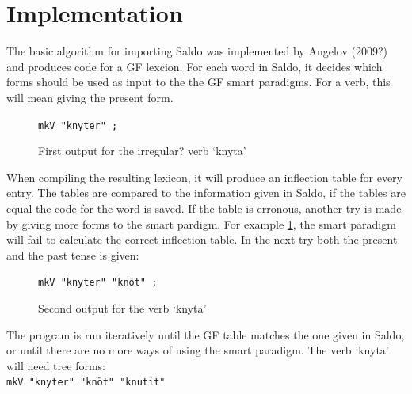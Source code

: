 \documentclass{report}
\begin{document}
\section{Implementation}
The basic algorithm for importing Saldo was implemented by Angelov (2009?)
and  produces code for a GF lexcion.
For each word in Saldo, it decides which forms should be used as input
to the the GF smart paradigms. For a verb, this will mean giving
the present form. \\

\begin{figure}[h]
\verb-mkV "knyter" ;-
\caption{First output for the irregular? verb `knyta'}
\label{fig:saldoknyt}
\end{figure}

When compiling the resulting lexicon, it will produce an inflection table
for every entry. The tables are compared to the information given
in Saldo, if the tables are equal the code for the word is saved. If the table
is erronous, another try is made
by giving more forms to the smart pardigm.
For example \ref{fig:saldoknyt}, the smart paradigm will fail to calculate the
correct inflection table. In the next try both the present and the past tense
is given:\\

\begin{figure}[h]
\verb-mkV "knyter" "knöt" ;-
\caption{Second output for the verb `knyta'}
\label{fig:saldoknyt2}
\end{figure}
The program is run iteratively until the GF table matches the one given in Saldo,
or until there are no more ways of using the smart paradigm. The verb 'knyta'
will need tree forms:\\

\verb-mkV "knyter" "knöt" "knutit"-\\

\end{document}
